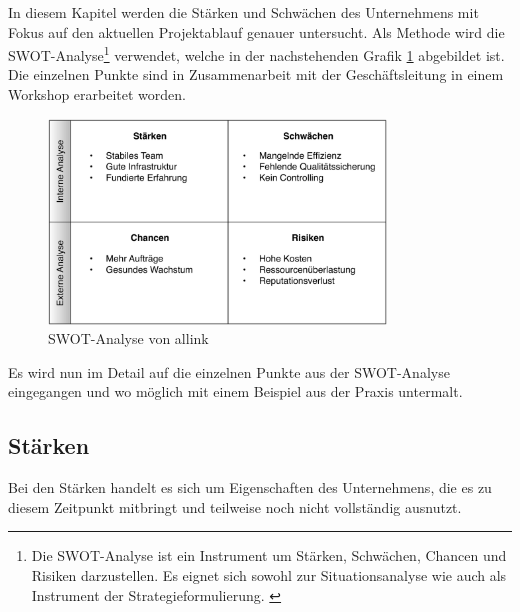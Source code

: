 In diesem Kapitel werden die Stärken und Schwächen des Unternehmens mit Fokus
auf den aktuellen Projektablauf genauer untersucht. Als Methode
wird die SWOT-Analyse\footnote{Die SWOT-Analyse ist ein Instrument um
Stärken, Schwächen, Chancen und Risiken darzustellen. Es eignet sich sowohl zur Situationsanalyse
wie auch als Instrument der Strategieformulierung. \citealp*[Vgl.][S. 134]{homburg2000quantitative}} 
verwendet, welche in der nachstehenden Grafik \ref{pic:swot_analyse} abgebildet ist.
Die einzelnen Punkte sind in Zusammenarbeit mit der Geschäftsleitung in einem Workshop
erarbeitet worden.


\begin{figure}[htbp]
\begin{center}
\includegraphics[width=0.8\textwidth,angle=0]{./bilder/analyse/swot_analyse.pdf}
\caption[SWOT-Analyse von allink]{SWOT-Analyse von allink\footnotemark}
\label{pic:swot_analyse}
\end{center}
\end{figure}

Es wird nun im Detail auf die einzelnen Punkte aus der SWOT-Analyse eingegangen
und wo möglich mit einem Beispiel aus der Praxis untermalt.

\subsection{Stärken}
Bei den Stärken handelt es sich um Eigenschaften des Unternehmens,
die es zu diesem Zeitpunkt mitbringt und teilweise noch nicht vollständig
ausnutzt. 


